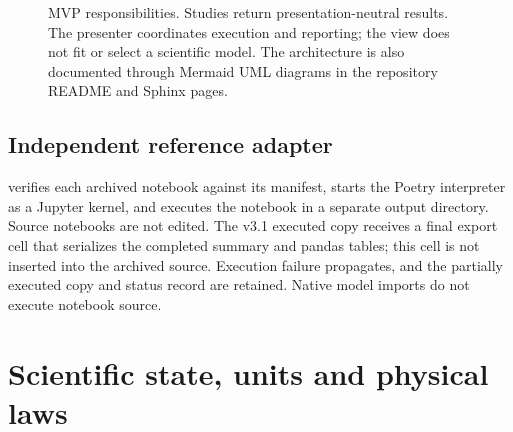 \documentclass[11pt,a4paper]{article}
\newcommand{\code}[1]{\texttt{\detokenize{#1}}}
\begin{document}
\begin{figure}[htbp]
\centering
{}
\caption{MVP responsibilities. Studies return presentation-neutral results. The presenter coordinates execution and reporting; the view does not fit or select a scientific model. The architecture is also documented through Mermaid UML diagrams in the repository README and Sphinx pages.}
\label{fig:architecture}
\end{figure}

\subsection{Independent reference adapter}

\code{ReferenceNotebookRunner} verifies each archived notebook against its manifest, starts the Poetry interpreter as a Jupyter kernel, and executes the notebook in a separate output directory. Source notebooks are not edited. The v3.1 executed copy receives a final export cell that serializes the completed summary and pandas tables; this cell is not inserted into the archived source. Execution failure propagates, and the partially executed copy and status record are retained. Native model imports do not execute notebook source.

\section{Scientific state, units and physical laws}\label{sec:physics}
\end{document}
